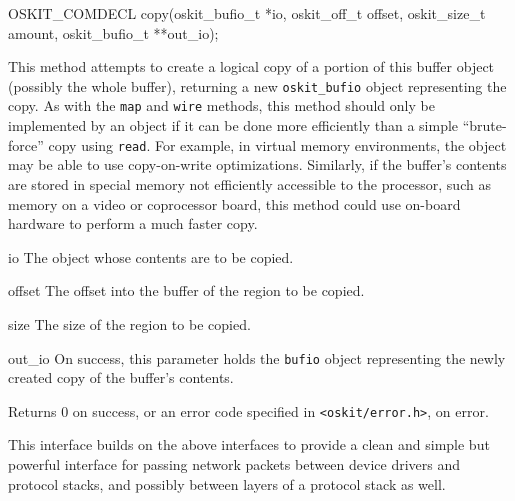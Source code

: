 \begin{apisyn}

	\funcproto OSKIT_COMDECL
	copy(oskit_bufio_t *io,
	       oskit_off_t offset, oskit_size_t amount,
	       \outparam oskit_bufio_t **out_io);
\end{apisyn}
\begin{apidesc}
	This method attempts to create
	a logical copy of a portion of this buffer object
	(possibly the whole buffer),
	returning a new \texttt{oskit_bufio} object representing the copy.
	As with the \texttt{map} and \texttt{wire} methods,
	this method should only be implemented by an object
	if it can be done more efficiently
	than a simple ``brute-force'' copy using \texttt{read}.
	For example, in virtual memory environments,
	the object may be able to use copy-on-write optimizations.
	Similarly, if the buffer's contents are stored
	in special memory not efficiently accessible to the processor,
	such as memory on a video or coprocessor board,
	this method could use on-board hardware to perform a much faster copy.
\end{apidesc}
\begin{apiparm}
	\item[io]
		The object whose contents are to be copied.
	\item[offset]
		The offset into the buffer of the region to be copied.
	\item[size]
		The size of the region to be copied.
	\item[out_io]
		On success,
		this parameter holds the \texttt{bufio} object
		representing the newly created copy of the buffer's contents.
\end{apiparm}
\begin{apiret}
	Returns 0 on success, or an error code specified in
	{\tt <oskit/error.h>}, on error.
\end{apiret}


\label{oskit-netio}

This interface builds on the above interfaces
to provide a clean and simple but powerful interface
for passing network packets between device drivers and protocol stacks,
and possibly between layers of a protocol stack as well.

